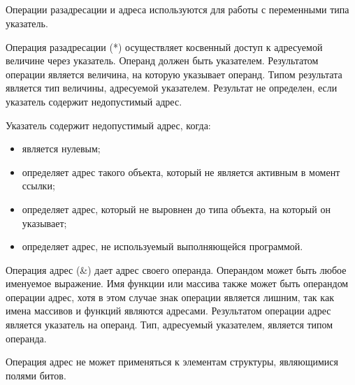 \subsection{}

Операции разадресации и адреса используются для работы с переменными типа указатель. \killoverfullbefore

Операция разадресации (*) осуществляет косвенный доступ к адресуемой величине через указатель. Операнд должен быть указателем. Результатом операции является величина, на которую указывает операнд. Типом результата является тип величины, адресуемой указателем. Результат не определен, если указатель содержит недопустимый адрес. \killoverfullbefore

Указатель содержит недопустимый адрес, когда:
\begin{itemize}
\item является нулевым;  
\item определяет адрес такого объекта, который не является активным в момент ссылки;  
\item определяет адрес, который не выровнен до типа объекта, на который он указывает; 
\item определяет адрес, не используемый выполняющейся программой. \killoverfullbefore \BL
\end{itemize}

Операция адрес (\&) дает адрес своего операнда. Операндом может быть любое именуемое выражение. Имя функции или массива также может быть операндом операции адрес, хотя в этом случае знак операции является лишним, так как имена массивов и функций являются адресами. Результатом операции адрес является указатель на операнд. Тип, адресуемый указателем, является типом операнда. \killoverfullbefore

Операция адрес не может применяться к элементам структуры, являющимися полями битов.\killoverfullbefore \BL

\clearpage

